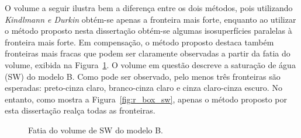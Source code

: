 
	O volume a seguir ilustra bem a diferença entre os dois métodos, pois utilizando \textit{Kindlmann e Durkin} obtém-se apenas a fronteira mais forte, enquanto ao utilizar o método proposto nesta dissertação obtém-se algumas isosuperfícies paralelas à fronteira mais forte. Em compensação, o método proposto destaca também fronteiras mais fracas que podem ser claramente observadas a partir da fatia do volume, exibida na Figura~\ref{fig:r_box_sw_slice}. O volume em questão descreve a saturação de água (SW) do modelo B. Como pode ser observado, pelo menos três fronteiras são esperadas: preto-cinza claro, branco-cinza claro e cinza claro-cinza escuro. No entanto, como mostra a Figura~\ref{fig:r_box_sw}, apenas o método proposto por esta dissertação realça todas as fronteiras.
	
\begin{figure}[h]
	\centering
	\caption{Fatia do volume de SW do modelo B.}
	\label{fig:r_box_sw_slice}
\end{figure}

